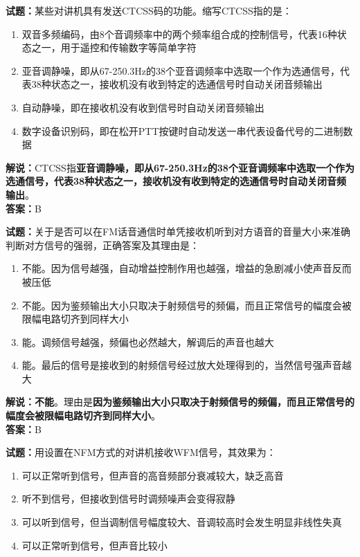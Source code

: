 \documentclass{ctexbook}
\begin{document}
\noindent\textbf{试题：}某些对讲机具有发送CTCSS码的功能。缩写CTCSS指的是：

\begin{enumerate}[leftmargin=3em]
  \item 双音多频编码，由8个音调频率中的两个频率组合成的控制信号，代表16种状态之一，用于遥控和传输数字等简单字符
  \item 亚音调静噪，即从67-250.3Hz的38个亚音调频率中选取一个作为选通信号，代表38种状态之一，接收机没有收到特定的选通信号时自动关闭音频输出
  \item 自动静噪，即在接收机没有收到信号时自动关闭音频输出
  \item 数字设备识别码，即在松开PTT按键时自动发送一串代表设备代号的二进制数据
\end{enumerate}

\noindent\textbf{解说：}CTCSS指\textbf{亚音调静噪，即从67-250.3Hz的38个亚音调频率中选取一个作为选通信号，代表38种状态之一，接收机没有收到特定的选通信号时自动关闭音频输出}。\\\noindent\textbf{答案：}B

\vspace{\baselineskip}

\noindent\textbf{试题：}关于是否可以在FM话音通信时单凭接收机听到对方语音的音量大小来准确判断对方信号的强弱，正确答案及其理由是：

\begin{enumerate}[leftmargin=3em]
  \item 不能。因为信号越强，自动增益控制作用也越强，增益的急剧减小使声音反而被压低
  \item 不能。因为鉴频输出大小只取决于射频信号的频偏，而且正常信号的幅度会被限幅电路切齐到同样大小
  \item 能。调频信号越强，频偏也必然越大，解调后的声音也越大
  \item 能。最后的信号是接收到的射频信号经过放大处理得到的，当然信号强声音越大
\end{enumerate}

\noindent\textbf{解说：}\textbf{不能}。理由是\textbf{因为鉴频输出大小只取决于射频信号的频偏，而且正常信号的幅度会被限幅电路切齐到同样大小}。\\\noindent\textbf{答案：}B

\vspace{\baselineskip}

\noindent\textbf{试题：}用设置在NFM方式的对讲机接收WFM信号，其效果为：

\begin{enumerate}[leftmargin=3em]
  \item 可以正常听到信号，但声音的高音频部分衰减较大，缺乏高音
  \item 听不到信号，但接收到信号时调频噪声会变得寂静
  \item 可以听到信号，但当调制信号幅度较大、音调较高时会发生明显非线性失真
  \item 可以正常听到信号，但声音比较小
\end{enumerate}
\end{document}
